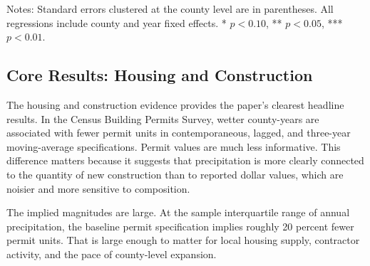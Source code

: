 \documentclass[12pt]{article}
\begin{document}
\begin{table}[htbp]
\centering
\caption{Baseline Fixed-Effects Estimates Across Headline Outcomes}
\label{tab:baseline_results}
{\footnotesize
\setlength{\tabcolsep}{5pt}

\medskip
\parbox{0.96\textwidth}{\footnotesize Notes: Standard errors clustered at the county level are in parentheses. All regressions include county and year fixed effects. * $p<0.10$, ** $p<0.05$, *** $p<0.01$.}
}
\end{table}

\subsection{Core Results: Housing and Construction}

The housing and construction evidence provides the paper's clearest headline results. In the Census Building Permits Survey, wetter county-years are associated with fewer permit units in contemporaneous, lagged, and three-year moving-average specifications. Permit values are much less informative. This difference matters because it suggests that precipitation is more clearly connected to the quantity of new construction than to reported dollar values, which are noisier and more sensitive to composition.

The implied magnitudes are large. At the sample interquartile range of annual precipitation, the baseline permit specification implies roughly 20 percent fewer permit units. That is large enough to matter for local housing supply, contractor activity, and the pace of county-level expansion.
\end{document}
